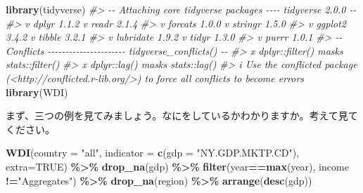 \documentclass[
  xelatex, ja=standard]{bxjsbook}
\newenvironment{Shaded}{\begin{snugshade}}{\end{snugshade}}
\newcommand{\AttributeTok}[1]{\textcolor[rgb]{0.13,0.29,0.53}{#1}}
\newcommand{\CommentTok}[1]{\textcolor[rgb]{0.56,0.35,0.01}{\textit{#1}}}
\newcommand{\ConstantTok}[1]{\textcolor[rgb]{0.56,0.35,0.01}{#1}}
\newcommand{\FunctionTok}[1]{\textcolor[rgb]{0.13,0.29,0.53}{\textbf{#1}}}
\newcommand{\NormalTok}[1]{#1}
\newcommand{\SpecialCharTok}[1]{\textcolor[rgb]{0.81,0.36,0.00}{\textbf{#1}}}
\newcommand{\StringTok}[1]{\textcolor[rgb]{0.31,0.60,0.02}{#1}}
\theoremstyle{definition}
\theoremstyle{definition}
\theoremstyle{definition}
\theoremstyle{definition}
\theoremstyle{remark}
\begin{document}
\begin{Shaded}
\begin{Highlighting}[]
\FunctionTok{library}\NormalTok{(tidyverse)}
\CommentTok{\#\textgreater{} {-}{-} Attaching core tidyverse packages {-}{-}{-}{-} tidyverse 2.0.0 {-}{-}}
\CommentTok{\#\textgreater{} v dplyr     1.1.2     v readr     2.1.4}
\CommentTok{\#\textgreater{} v forcats   1.0.0     v stringr   1.5.0}
\CommentTok{\#\textgreater{} v ggplot2   3.4.2     v tibble    3.2.1}
\CommentTok{\#\textgreater{} v lubridate 1.9.2     v tidyr     1.3.0}
\CommentTok{\#\textgreater{} v purrr     1.0.1     }
\CommentTok{\#\textgreater{} {-}{-} Conflicts {-}{-}{-}{-}{-}{-}{-}{-}{-}{-}{-}{-}{-}{-}{-}{-}{-}{-}{-}{-}{-}{-} tidyverse\_conflicts() {-}{-}}
\CommentTok{\#\textgreater{} x dplyr::filter() masks stats::filter()}
\CommentTok{\#\textgreater{} x dplyr::lag()    masks stats::lag()}
\CommentTok{\#\textgreater{} i Use the conflicted package (\textless{}http://conflicted.r{-}lib.org/\textgreater{}) to force all conflicts to become errors}
\FunctionTok{library}\NormalTok{(WDI)}
\end{Highlighting}
\end{Shaded}

まず、三つの例を見てみましょう。なにをしているかわかりますか。考えて見てください。

\begin{Shaded}
\begin{Highlighting}[]
\FunctionTok{WDI}\NormalTok{(}\AttributeTok{country =} \StringTok{"all"}\NormalTok{, }\AttributeTok{indicator =} \FunctionTok{c}\NormalTok{(}\AttributeTok{gdp =} \StringTok{"NY.GDP.MKTP.CD"}\NormalTok{),}
    \AttributeTok{extra=}\ConstantTok{TRUE}\NormalTok{) }\SpecialCharTok{\%\textgreater{}\%} \FunctionTok{drop\_na}\NormalTok{(gdp) }\SpecialCharTok{\%\textgreater{}\%}
  \FunctionTok{filter}\NormalTok{(year}\SpecialCharTok{==}\FunctionTok{max}\NormalTok{(year), income }\SpecialCharTok{!=}\StringTok{"Aggregates"}\NormalTok{) }\SpecialCharTok{\%\textgreater{}\%} 
  \FunctionTok{drop\_na}\NormalTok{(region) }\SpecialCharTok{\%\textgreater{}\%} \FunctionTok{arrange}\NormalTok{(}\FunctionTok{desc}\NormalTok{(gdp))}
\end{Highlighting}
\end{Shaded}
\end{document}
